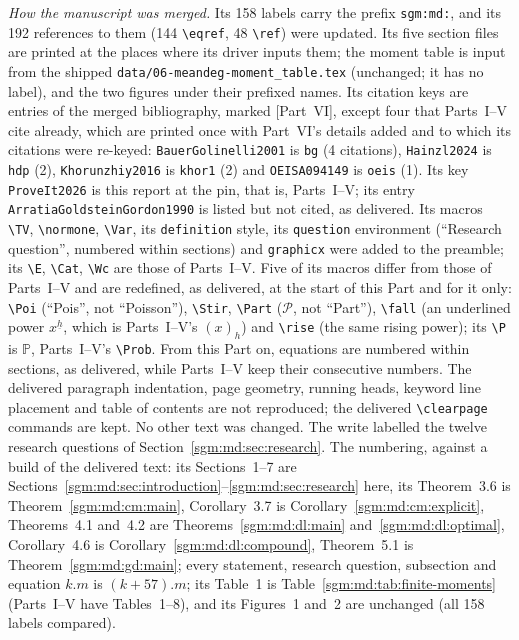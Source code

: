 \documentclass[11pt,letterpaper]{article}
\theoremstyle{remark}\newtheorem{remark}[theorem]{Remark}
\newcommand{\Wc}{\mathcal W}\newcommand{\Uc}{\mathcal U}\newcommand{\Part}{\operatorname{Part}}
\newcommand{\Cat}{\operatorname{Cat}}\newcommand{\E}{\mathbb E}\newcommand{\Prob}{\mathbb P}\newcommand{\ind}{\mathbf 1}
\newcommand{\Poi}{\operatorname{Poisson}}\newcommand{\Bin}{\operatorname{Bin}}
\newcommand{\fall}[2]{(#1)_{#2}}\newcommand{\rise}[2]{#1^{\overline{#2}}}
\newcommand{\Stir}[2]{\left\{\begin{matrix}#1\\#2\end{matrix}\right\}}
\newcommand{\file}[1]{\nolinkurl{#1}}
\theoremstyle{definition}\newtheorem{definition}[theorem]{Definition}
\newcommand{\TV}{d_{\mathrm{TV}}}
\newcommand{\normone}[1]{\left\lVert #1\right\rVert_1}
\DeclareMathOperator{\Var}{Var}
\begin{document}
\emph{How the manuscript was merged.} Its 158 labels carry the prefix
\file{sgm:md:}, and its 192 references to them (144 \verb|\eqref|, 48
\verb|\ref|) were updated. Its five section files are printed at the places
where its driver inputs them; the moment table is input from the shipped
\file{data/06-meandeg-moment_table.tex} (unchanged; it has no label), and the
two figures under their prefixed names. Its citation keys are entries of the
merged bibliography, marked [Part~VI], except four that Parts~I--V cite
already, which are printed once with Part~VI's details added and to which
its citations were re-keyed: \file{BauerGolinelli2001} is \file{bg} (4
citations), \file{Hainzl2024} is \file{hdp} (2), \file{Khorunzhiy2016} is
\file{khor1} (2) and \file{OEISA094149} is \file{oeis} (1). Its key
\file{ProveIt2026} is this report at the pin, that is, Parts~I--V; its entry
\file{ArratiaGoldsteinGordon1990} is listed but not cited, as delivered. Its
macros \verb|\TV|, \verb|\normone|, \verb|\Var|, its \texttt{definition} style,
its \texttt{question} environment (``Research question'', numbered within
sections) and \texttt{graphicx} were added to the preamble; its \verb|\E|,
\verb|\Cat|, \verb|\Wc| are those of Parts~I--V. Five of its macros differ
from those of Parts~I--V and are redefined, as delivered, at the start of
this Part and for it only: \verb|\Poi| (``Pois'', not ``Poisson''),
\verb|\Stir|, \verb|\Part| ($\mathcal P$, not ``Part''), \verb|\fall| (an
underlined power $x^{\underline h}$, which is Parts~I--V's $(x)_h$) and
\verb|\rise| (the same rising power); its \verb|\P| is $\mathbb P$, Parts~I--V's
\verb|\Prob|. From this Part on, equations are numbered within sections, as
delivered, while Parts~I--V keep their consecutive numbers. The delivered
paragraph indentation, page geometry, running heads, keyword line placement
and table of contents are not reproduced; the delivered \verb|\clearpage|
commands are kept. No other text was changed. The write labelled the twelve
research questions of Section~\ref{sgm:md:sec:research}. The numbering,
against a build of the delivered text: its Sections~1--7 are
Sections~\ref{sgm:md:sec:introduction}--\ref{sgm:md:sec:research} here, its
Theorem~3.6 is Theorem~\ref{sgm:md:cm:main}, Corollary~3.7 is
Corollary~\ref{sgm:md:cm:explicit}, Theorems~4.1 and~4.2 are
Theorems~\ref{sgm:md:dl:main} and~\ref{sgm:md:dl:optimal}, Corollary~4.6 is
Corollary~\ref{sgm:md:dl:compound}, Theorem~5.1 is
Theorem~\ref{sgm:md:gd:main}; every statement, research question,
subsection and equation $k.m$ is $(k{+}57).m$; its Table~1 is
Table~\ref{sgm:md:tab:finite-moments} (Parts~I--V have Tables~1--8), and its
Figures~1 and~2 are unchanged (all 158 labels compared).
\end{document}
